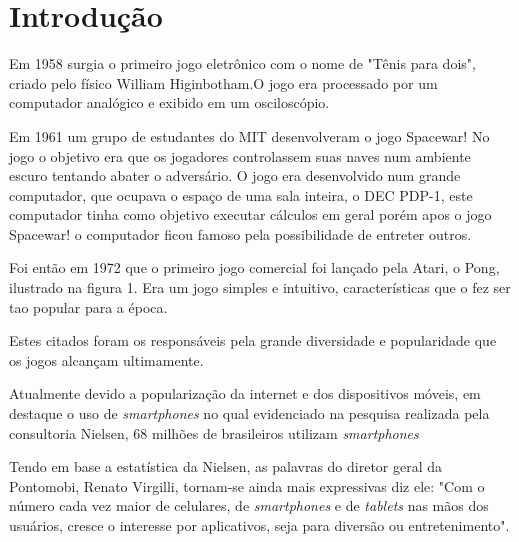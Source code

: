\chapter{Introdução}
\label{cap:introducao}
 
 
Em 1958 surgia o primeiro jogo eletrônico com o nome de "Tênis para dois", criado pelo físico William Higinbotham.O jogo era processado por um computador analógico e exibido em um osciloscópio.
\cite{mass}


Em 1961 um grupo de estudantes do MIT desenvolveram o jogo Spacewar! No jogo o objetivo era que os jogadores controlassem suas naves num ambiente escuro tentando abater o adversário. O jogo era desenvolvido num grande computador, que ocupava o espaço de uma sala inteira, o DEC PDP-1, este computador tinha como objetivo executar cálculos em geral porém apos o jogo Spacewar! o computador ficou famoso pela possibilidade de entreter outros. \cite{ram}


Foi então em 1972 que o primeiro jogo comercial foi lançado pela Atari, o Pong, ilustrado na figura 1. Era um jogo simples e intuitivo, características que o fez ser tao popular para a época. \cite{tracc} 

\begin{figure}[h!]
		\centering
	\end{figure}


Estes citados foram os responsáveis pela grande diversidade e popularidade que os jogos alcançam ultimamente.

Atualmente devido a popularização da internet e dos dispositivos móveis, em destaque o uso de \textit{smartphones} no qual evidenciado na pesquisa realizada pela consultoria Nielsen, 68 milhões de brasileiros utilizam \textit{smartphones} \cite{nie} 

Tendo em base a estatística da Nielsen, as palavras do diretor geral da Pontomobi, Renato Virgilli, tornam-se ainda mais expressivas diz ele: "Com o número cada vez maior de celulares, de \textit{smartphones} e de \textit{tablets} nas mãos dos usuários, cresce o interesse por aplicativos, seja para diversão ou entretenimento". \cite{vir}

